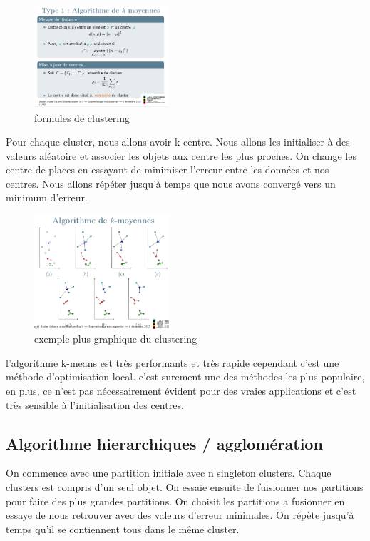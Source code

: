 \documentclass[oneside]{book}
\begin{document}
\begin{figure}[!ht]
\centering
\includegraphics[width = 5cm]{clustering.png}
\caption{formules de clustering}
\end{figure}


Pour chaque cluster, nous allons avoir k centre. Nous allons les initialiser à des valeurs aléatoire et associer les objets aux centre les plus proches. On change les centre de places en essayant de minimiser l'erreur entre les données et nos centres. Nous allons répéter jusqu'à temps que nous avons convergé vers un minimum d'erreur. \\

\begin{figure}[!ht]
\centering
\includegraphics[width = 5cm]{clusters.png}
\caption{exemple plus graphique du clustering}
\end{figure}

l'algorithme k-means est très performants et très rapide cependant c'est une méthode d'optimisation local.  c'est surement une des méthodes les plus populaire, en plus, ce n'est pas nécessairement évident pour des vraies applications et c'est très sensible à l'initialisation des centres.
\subsection{Algorithme hierarchiques / agglomération}
On commence avec une partition initiale avec n singleton clusters. Chaque clusters est compris d'un seul objet. On essaie ensuite de fuisionner nos partitions pour faire des plus grandes partitions. On choisit les partitions a fusionner en essaye de nous retrouver avec des valeurs d'erreur minimales. On répète jusqu'à temps qu'il se contiennent tous dans le même cluster.\\
\end{document}
